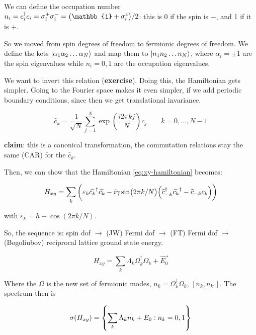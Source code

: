 \documentclass[main.tex]{subfiles}
\begin{document}
We can define the occupation number \(n_i = c_i^\dag c_i = \sigma_i^+ \sigma_i^- = \qty(\mathbb{1} + \sigma_i^z)/2\): this is 0 if the spin is \(-\), and 1 if it is \(+\).

So we moved from spin degrees of freedom to fermionic degrees of freedom. We define the kets \(\ket{\alpha_1 \alpha_2 \dots \alpha_N} \) and map them to \(\ket{n_1 n_2 \dots n_N} \), where \(\alpha_i = \pm 1\) are the spin eigenvalues while \(n_i = 0,1\) are the occupation eigenvalues.

We want to invert this relation (\textbf{exercise}). Doing this, the Hamiltonian gets simpler. Going to the Fourier space makes it even simpler, if we add periodic boundary conditions, since then we get translational invariance.

\begin{equation}
    \widetilde{c_k} = \frac{1}{\sqrt{N} } \sum _{j=1}   ^{N} \exp(\frac{i 2 \pi k j}{N}) c_j  \qquad k = 0, \dots, N-1
\end{equation}

\textbf{claim}: this is a canonical transformation, the commutation relations stay the same (CAR) for the \(\widetilde{c_k} \).

Then, we can show that the Hamiltonian \eqref{eq:xy-hamiltonian} becomes:

\begin{equation}
    H _{xy} = \sum _k \qty(\varepsilon_k \widetilde{c_k} ^\dag \widetilde{c_k} - i \gamma \sin(2 \pi k/N) \qty(\widetilde{c}_{-k}^\dag \widetilde{c_k}^\dag - \widetilde{c}_{-k} c_k))
\end{equation}

with \(\varepsilon_k = h - \cos(2 \pi k /N)\).

So, the sequence is: spin dof \(\rightarrow\) (JW) Fermi dof \(\rightarrow\) (FT) Fermi dof \(\rightarrow\) (Bogoliubov) reciprocal lattice ground state energy.

\begin{equation}
    H _{xy} = \sum _{k}  \Lambda_k \Omega_k ^\dag \Omega_k + \vec{E_0}
\end{equation}

Where the \(\Omega\) is the new set of fermionic modes, \(n_k = \Omega_k ^\dag \Omega_k\), \([n_ k, n_{k'}]\). The spectrum then is

\begin{equation} \label{eq:xy-spectrum}
    \sigma(H _{xy} ) = \qty{\sum _{k}  \Lambda_k n_k + E_0 :  n_k = 0, 1 }
\end{equation}
\end{document}
